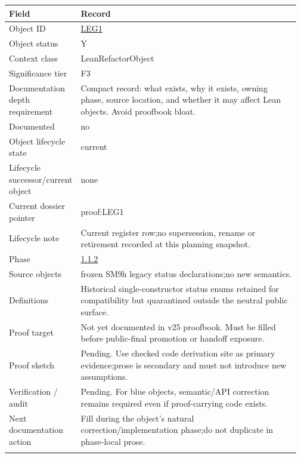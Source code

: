\begin{longtable}{L{0.16\linewidth} L{0.81\linewidth}}
\hline
\textbf{Field} & \textbf{Record}\\
\hline
Object ID & \hyperlink{object-row-LEG1}{LEG1}\\
\hline\addlinespace[0.20em]
Object status & Y\\
\hline\addlinespace[0.20em]
Context class & LeanRefactorObject\\
\hline\addlinespace[0.20em]
Significance tier & F3\\
\hline\addlinespace[0.20em]
Documentation depth requirement & Compact record: what exists, why it exists, owning phase, source location, and whether it may affect Lean objects. Avoid proofbook bloat.\\
\hline\addlinespace[0.20em]
Documented & no\\
\hline\addlinespace[0.20em]
Object lifecycle state & current\\
\hline\addlinespace[0.20em]
Lifecycle successor/\allowbreak{}current object & none\\
\hline\addlinespace[0.20em]
Current dossier pointer & proof:LEG1\\
\hline\addlinespace[0.20em]
Lifecycle note & Current register row;\newline no supersession, rename or retirement recorded at this planning snapshot.\\
\hline\addlinespace[0.20em]
Phase & \hyperlink{phase-row-1-1-2}{1.1.2}\\
\hline\addlinespace[0.20em]
Source objects & frozen SM9h legacy status declarations;\newline no new semantics.\\
\hline\addlinespace[0.20em]
Definitions & Historical single-constructor status enums retained for compatibility but quarantined outside the neutral public surface.\\
\hline\addlinespace[0.20em]
Proof target & Not yet documented in v25 proofbook. Must be filled before public-final promotion or handoff exposure.\\
\hline\addlinespace[0.20em]
Proof sketch & Pending. Use checked code derivation site as primary evidence;\newline prose is secondary and must not introduce new assumptions.\\
\hline\addlinespace[0.20em]
Verification /\allowbreak{} audit & Pending. For blue objects, semantic/\allowbreak{}API correction remains required even if proof-carrying code exists.\\
\hline\addlinespace[0.20em]
Next documentation action & Fill during the object's natural correction/\allowbreak{}implementation phase;\newline do not duplicate in phase-local prose.\\
\hline\addlinespace[0.20em]
\end{longtable}
